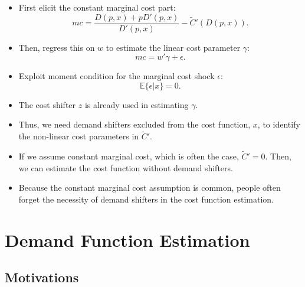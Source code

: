 \documentclass[
]{book}
\providecommand{\tightlist}{%
  \setlength{\itemsep}{0pt}\setlength{\parskip}{0pt}}
\begin{document}
\begin{itemize}
\tightlist
\item
  First elicit the constant marginal cost part:
  \begin{equation}
    mc = \frac{D(p, x) + pD'(p, x)}{D'(p, x)} - \tilde{C}'(D(p, x)).
  \end{equation}
\item
  Then, regress this on \(w\) to estimate the linear cost parameter \(\gamma\):
  \begin{equation}
    mc = w'\gamma + \epsilon.
  \end{equation}
\item
  Exploit moment condition for the marginal cost shock \(\epsilon\):
  \begin{equation}
    \mathbb{E}\{\epsilon | x\} = 0.
  \end{equation}
\item
  The cost shifter \(z\) is already used in estimating \(\gamma\).
\item
  Thus, we need demand shifters excluded from the cost function, \(x\), to identify the non-linear cost parameters in \(\tilde{C}'\).
\item
  If we assume constant marginal cost, which is often the case, \(\tilde{C}' = 0\). Then, we can estimate the cost function without demand shifters.
\item
  Because the constant marginal cost assumption is common, people often forget the necessity of demand shifters in the cost function estimation.
\end{itemize}

\hypertarget{demand}{%
\chapter{Demand Function Estimation}\label{demand}}

\hypertarget{motivations-1}{%
\section{Motivations}\label{motivations-1}}
\end{document}
